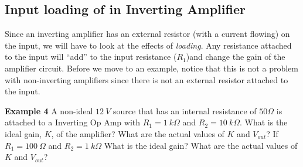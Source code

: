 \documentclass{handout}
\begin{document}
\newpage
\clearpage
\pagebreak

\subsection{Input loading of in Inverting Amplifier}
Since an inverting amplifier has an external resistor (with a current flowing) on the input, we will have to look at the effects of {\em loading}.  Any resistance attached to the input will ``add'' to the input resistance ($R_1$)and change the gain of the amplifier circuit.  Before we move to an example, notice that this is not a problem with non-inverting amplifiers since there is not an external resistor attached to the input.

\textbf{Example 4} A non-ideal $12\ V$ source that has an internal resistance of $50 \Omega$ is attached to a Inverting Op Amp with $R_1 = 1\ k\Omega$ and $R_2 = 10\ k\Omega$.  What is the ideal gain, $K$, of the amplifier? What are the actual values of $K$ and $V_{out}$? If $R_1 = 100\ \Omega$ and $R_2 = 1\ k\Omega$ What is the ideal gain?  What are the actual values of $K$ and $V_{out}$?



\newpage
\clearpage
\pagebreak

\newpage
\clearpage
\pagebreak

\newpage
\clearpage
\pagebreak

\newpage
\clearpage
\pagebreak

\newpage
\clearpage
\pagebreak
\end{document}
